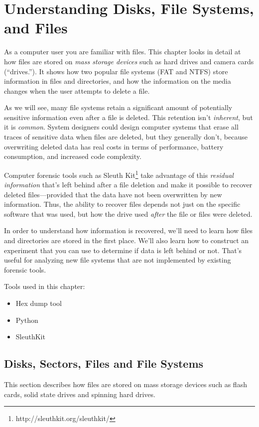 \chapter{Understanding Disks, File Systems, and Files}\label{ch-drives}
As a computer user you are familiar with files. This chapter looks in
detail at how files are stored on \emph{mass storage devices} such as
hard drives and camera cards (``drives.''). It shows how two popular file systems
(FAT and NTFS) store information in files and directories, and how the
information on the media changes when the user attempts to delete a
file.

As we will see, many file systems retain a significant amount of
potentially sensitive information even after a file is deleted. This
retention isn't \emph{inherent}, but it is \emph{common}. 
System designers could design computer systems that erase all traces of
sensitive data when files are deleted, but they generally don't, because
overwriting deleted data has real costs in terms of performance,
battery consumption, and increased code complexity.

Computer forensic tools such as Sleuth
Kit\footnote{http://sleuthkit.org/sleuthkit/} take advantage of this
\emph{residual information} that's left behind after a file deletion
and make it possible to recover deleted files---provided that the data
have not been overwritten by new information. Thus, the ability to
recover files depends not just on the specific software that
was used, but how the drive used \emph{after} the file or files were
deleted.   

In order to understand how information is recovered,
we'll need to learn how files and directories are stored in the first
place. We'll also learn how to construct an experiment that you can
use to determine if data is left behind or not. That's useful for
analyzing new file systems that are not implemented by existing
forensic tools.

Tools used in this chapter:
\begin{itemize}
\item Hex dump tool
\item Python
\item SleuthKit 
\end{itemize}

\section{Disks, Sectors, Files and File Systems}
This section describes how files are stored on mass storage devices
such as flash cards, solid state drives and spinning hard drives. 


